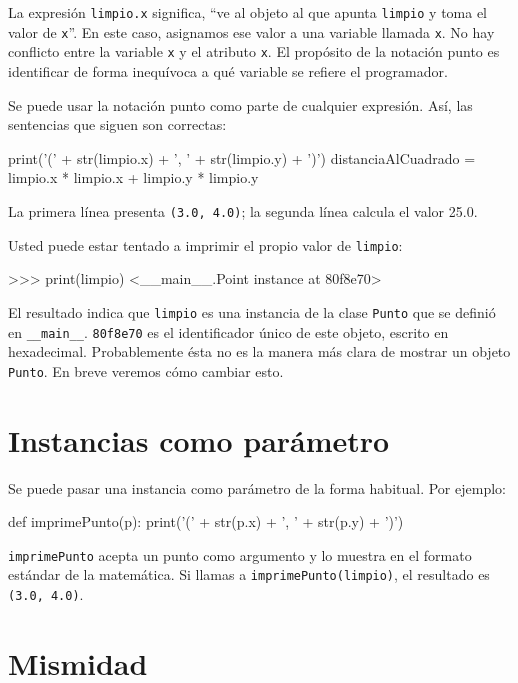 La expresión \texttt{limpio.x} significa, ``ve al objeto al que apunta
\texttt{limpio} y toma el valor de \texttt{x}''. En este caso, asignamos
ese valor a una variable llamada \texttt{x}. No hay conflicto entre
la variable \texttt{x} y el atributo \texttt{x}. El propósito de la
notación punto es identificar de forma inequívoca a qué variable se
refiere el programador.

Se puede usar la notación punto como parte de cualquier expresión.
Así, las sentencias que siguen son correctas:
\begin{pythoncode}
print('(' + str(limpio.x) + ', ' + str(limpio.y) + ')')
distanciaAlCuadrado = limpio.x * limpio.x + 
                      limpio.y * limpio.y
\end{pythoncode}

La primera línea presenta \texttt{(3.0, 4.0)}; la segunda línea calcula
el valor 25.0.

Usted puede estar tentado a imprimir el propio valor de \texttt{limpio}:
\begin{pyconcode}
>>> print(limpio)
<__main__.Point instance at 80f8e70>
\end{pyconcode}

El resultado indica que \texttt{limpio} es una instancia de la clase
\texttt{Punto} que se definió en \texttt{\_\_main\_\_}. \texttt{80f8e70}
es el identificador único de este objeto, escrito en hexadecimal.
Probablemente ésta no es la manera más clara de mostrar un objeto
\texttt{Punto}. En breve veremos cómo cambiar esto.


\section{Instancias como parámetro}

 

Se puede pasar una instancia como parámetro de la forma habitual.
Por ejemplo:
\begin{pythoncode}
def imprimePunto(p):
  print('(' + str(p.x) + ', ' + str(p.y) + ')')
\end{pythoncode}

\texttt{imprimePunto} acepta un punto como argumento y lo muestra
en el formato estándar de la matemática. Si llamas a \texttt{imprimePunto(limpio)},
el resultado es \texttt{(3.0, 4.0)}.

\section{Mismidad}

